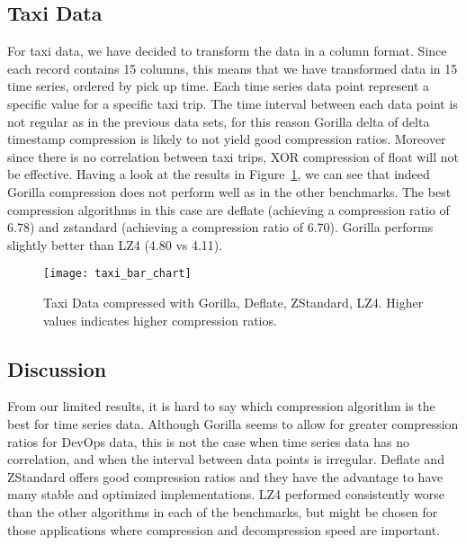 \subsection{Taxi Data}
For taxi data, we have decided to transform the data in a column format.
Since each record contains 15 columns, this means that we have transformed data in 15 time series,
ordered by pick up time.
Each time series data point represent a specific value for a specific taxi trip.
The time interval between each data point is not regular as in the previous data sets, for this
reason Gorilla delta of delta timestamp compression is likely to not yield good compression
ratios. Moreover since there is no correlation between taxi trips, XOR compression of float will
not be effective.
Having a look at the results in Figure~\ref{taxi_bar_chart}, we can see that indeed Gorilla compression does not perform well as
in the other benchmarks. The best compression algorithms in this case are deflate (achieving a compression
ratio of 6.78) and zstandard (achieving a compression ratio of 6.70). Gorilla performs slightly
better than LZ4 (4.80 vs 4.11).

\begin{figure}[!htbp]
\begin{center}
\texttt{[image: taxi\_bar\_chart]}
\caption[compression]{Taxi Data compressed with Gorilla, Deflate, ZStandard, LZ4.
Higher values indicates higher compression ratios.}
\label{taxi_bar_chart}
\end{center}
\end{figure}

\subsection{Discussion}
From our limited results, it is hard to say which compression algorithm is the best for time series data.
Although Gorilla seems to allow for greater compression ratios for DevOps data, this is not the case when
time series data has no correlation, and when the interval between data points is irregular.
Deflate and ZStandard offers good compression ratios and they have the advantage to have many stable and
optimized implementations.
LZ4 performed consistently worse than the other algorithms in each of the benchmarks, but might be chosen
for those applications where compression and decompression speed are important.

